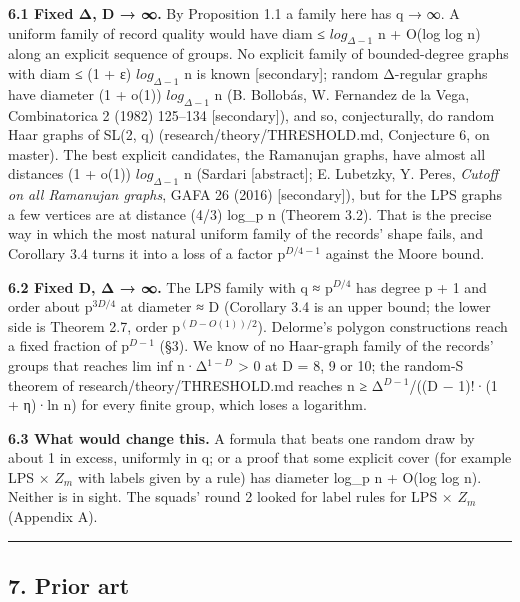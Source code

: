 \documentclass[
  10pt,
]{article}
\begin{document}
\textbf{6.1 Fixed Δ, D → ∞.} By Proposition 1.1 a family here has q → ∞.
A uniform family of record quality would have diam ≤ \(log_{Δ−1}\) n +
O(log log n) along an explicit sequence of groups. No explicit family of
bounded-degree graphs with diam ≤ (1 + ε) \(log_{Δ−1}\) n is known
{[}secondary{]}; random Δ-regular graphs have diameter (1 + o(1))
\(log_{Δ−1}\) n (B. Bollobás, W. Fernandez de la Vega, Combinatorica 2
(1982) 125--134 {[}secondary{]}), and so, conjecturally, do random Haar
graphs of SL(2, q) (research/theory/THRESHOLD.md, Conjecture 6, on
master). The best explicit candidates, the Ramanujan graphs, have almost
all distances (1 + o(1)) \(log_{Δ−1}\) n (Sardari {[}abstract{]}; E.
Lubetzky, Y. Peres, \emph{Cutoff on all Ramanujan graphs}, GAFA 26
(2016) {[}secondary{]}), but for the LPS graphs a few vertices are at
distance (4/3) log\_p n (Theorem 3.2). That is the precise way in which
the most natural uniform family of the records' shape fails, and
Corollary 3.4 turns it into a loss of a factor p\(^{D/4−1}\) against the
Moore bound.

\textbf{6.2 Fixed D, Δ → ∞.} The LPS family with q ≈ p\(^{D/4}\) has
degree p + 1 and order about p\(^{3D/4}\) at diameter ≈ D (Corollary 3.4
is an upper bound; the lower side is Theorem 2.7, order
p\(^{(D−O(1))/2}\)). Delorme's polygon constructions reach a fixed
fraction of p\(^{D−1}\) (§3). We know of no Haar-graph family of the
records' groups that reaches lim inf n·Δ\(^{1−D}\) \textgreater{} 0 at D
= 8, 9 or 10; the random-S theorem of research/theory/THRESHOLD.md
reaches n ≥ Δ\(^{D−1}\)/((D − 1)!·(1 + η)·ln n) for every finite group,
which loses a logarithm.

\textbf{6.3 What would change this.} A formula that beats one random
draw by about 1 in excess, uniformly in q; or a proof that some explicit
cover (for example LPS × \(Z_{m}\) with labels given by a rule) has
diameter log\_p n + O(log log n). Neither is in sight. The squads' round
2 looked for label rules for LPS × \(Z_{m}\) (Appendix A).

\begin{center}\rule{0.5\linewidth}{0.5pt}\end{center}

\hypertarget{prior-art}{%
\subsection{7. Prior art}\label{prior-art}}
\end{document}
